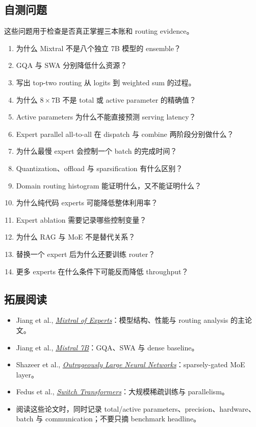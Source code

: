 \subsection{自测问题}

这些问题用于检查是否真正掌握三本账和 routing evidence。

\begin{enumerate}
  \item 为什么 Mixtral 不是八个独立 7B 模型的 ensemble？
  \item GQA 与 SWA 分别降低什么资源？
  \item 写出 top-two routing 从 logits 到 weighted sum 的过程。
  \item 为什么 $8\times 7\mathrm{B}$ 不是 total 或 active parameter 的精确值？
  \item Active parameters 为什么不能直接预测 serving latency？
  \item Expert parallel all-to-all 在 dispatch 与 combine 两阶段分别做什么？
  \item 为什么最慢 expert 会控制一个 batch 的完成时间？
  \item Quantization、offload 与 sparsification 有什么区别？
  \item Domain routing histogram 能证明什么，又不能证明什么？
  \item 为什么纯代码 experts 可能降低整体利用率？
  \item Expert ablation 需要记录哪些控制变量？
  \item 为什么 RAG 与 MoE 不是替代关系？
  \item 替换一个 expert 后为什么还要训练 router？
  \item 更多 experts 在什么条件下可能反而降低 throughput？
\end{enumerate}

\subsection{拓展阅读}

\begin{itemize}
  \item Jiang et al., \href{https://arxiv.org/abs/2401.04088}{\emph{Mixtral of Experts}}：模型结构、性能与 routing analysis 的主论文。
  \item Jiang et al., \href{https://arxiv.org/abs/2310.06825}{\emph{Mistral 7B}}：GQA、SWA 与 dense baseline。
  \item Shazeer et al., \href{https://arxiv.org/abs/1701.06538}{\emph{Outrageously Large Neural Networks}}：sparsely-gated MoE layer。
  \item Fedus et al., \href{https://arxiv.org/abs/2101.03961}{\emph{Switch Transformers}}：大规模稀疏训练与 parallelism。
  \item 阅读这些论文时，同时记录 total/active parameters、precision、hardware、batch 与 communication；不要只摘 benchmark headline。
\end{itemize}


